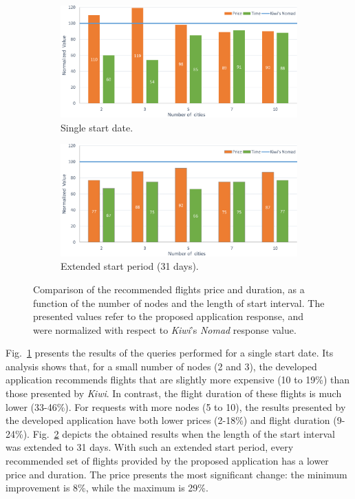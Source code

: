 \documentclass[onecolumn]{elsarticle}
\begin{document}
\begin{figure}[!ht]
    \centering
    \begin{subfigure}[a]{1\columnwidth}
      \includegraphics[width=1\columnwidth]{fig7a.eps}
      \caption{Single start date.}
      \label{fig:comparison_a} 
    \end{subfigure}
    \begin{subfigure}[b]{1\columnwidth}
      \includegraphics[width=1\columnwidth]{fig7b.eps}
      \caption{Extended start period (31 days).}
      \label{fig:comparison_b}
    \end{subfigure}
 \caption{Comparison of the recommended flights price and duration, as a function of the number of nodes and the length of start interval. The presented values refer to the proposed application response, and were normalized with respect to \textit{Kiwi}'s \textit{Nomad} response value.}
 \label{fig:comparison}
\end{figure}

Fig.~\ref{fig:comparison_a} presents the results of the queries performed for a single start date. Its analysis shows that, for a small number of nodes (2 and 3), the developed application recommends flights that are slightly more expensive (10 to 19\%) than those presented by \textit{Kiwi}. In contrast, the flight duration of these flights is much lower (33-46\%). For requests with more nodes (5 to 10), the results presented by the developed application have both lower prices (2-18\%) and flight duration (9-24\%). Fig.~\ref{fig:comparison_b} depicts the obtained results when the length of the start interval was extended to 31 days. With such an extended start period, every recommended set of flights provided by the proposed application has a lower price and duration. The price presents the most significant change: the minimum improvement is 8\%, while the maximum is 29\%.
\end{document}
